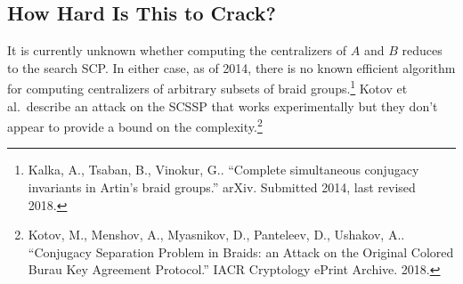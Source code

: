 \documentclass[11pt]{article}
\begin{document}
\subsection*{How Hard Is This to Crack?}
It is currently unknown whether computing the centralizers of $A$ and $B$ reduces to the search SCP. In either case, as of 2014, there is no known efficient algorithm for computing centralizers of arbitrary subsets of braid groups.\footnote{Kalka, A., Tsaban, B., Vinokur, G.. ``Complete simultaneous conjugacy invariants in Artin's braid groups.'' arXiv. Submitted 2014, last revised 2018.} Kotov et al.\ describe an attack on the SCSSP that works experimentally but they don't appear to provide a bound on the complexity.\footnote{Kotov, M., Menshov, A., Myasnikov, D., Panteleev, D., Ushakov, A.. ``Conjugacy Separation Problem in Braids: an Attack on the Original Colored Burau Key Agreement Protocol.'' IACR Cryptology ePrint Archive. 2018.}
\end{document}
